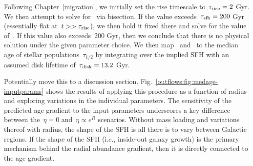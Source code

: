 Following Chapter~\ref{migration}, we initially set the rise timescale
to~$\tau_\text{rise} = 2$ Gyr.
We then attempt to solve for~ via bisection.
If the value exceeds~$\tau_\text{sfh} = 200$ Gyr (essentially flat
at~$t >> \tau_\text{rise}$), we then hold it fixed there and solve for the
value of~.
If this value also exceeds~$200$ Gyr, then we conclude that there is no
physical solution under the given parameter choice.
We then map~ and~ to the median age of stellar
populations~$\tau_{1/2}$ by integrating over the implied SFH with an assumed
disk lifetime of~$\tau_\text{disk} = 13.2$ Gyr.
\par
{\color{red} Potentially move this to a discussion section.}
Fig.~\ref{outflows:fig:medage-inputparams} shows the results of applying this
procedure as a function of radius and exploring variations in the individual
parameters.
The sensitivity of the predicted age gradient to the input parameters
underscores a key difference between the~$\eta = 0$ and~$\eta \propto e^R$
scenarios.
Without mass loading and variations thereof with radius, the shape of the SFH
is all there is to vary between Galactic regions.
If the shape of the SFH (i.e., inside-out galaxy growth) is the primary
mechanism behind the radial abundance gradient, then it is directly connected
to the age gradient.
\par







































